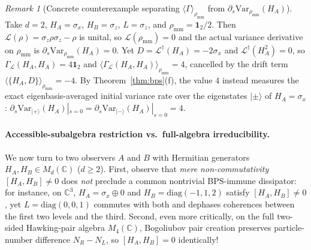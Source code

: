 \documentclass[11pt,a4paper]{article}
\theoremstyle{definition}
\theoremstyle{remark}
\newtheorem{remark}{Remark}
\newcommand{\cL}{\mathcal{L}}
\newcommand{\bbC}{\mathbb{C}}
\newcommand{\1}{\mathbf{1}}
\begin{document}
\begin{remark}[Concrete counterexample separating $\langle\Gamma\rangle_{\rho_{\mathrm{mm}}}$ from $\partial_s\mathrm{Var}_{\rho_{\mathrm{mm}}}(H_A)$]\label{rem:drift-counterexample}
Take $d=2$, $H_A = \sigma_x$, $H_B = \sigma_z$, $L = \sigma_z$, and $\rho_{\mathrm{mm}} = \1_2/2$. Then $\cL(\rho) = \sigma_z\rho\sigma_z - \rho$ is unital, so $\cL(\rho_{\mathrm{mm}}) = 0$ and the actual variance derivative on $\rho_{\mathrm{mm}}$ is $\partial_s \mathrm{Var}_{\rho_{\mathrm{mm}}}(H_A) = 0$. Yet $D = \cL^\dagger(H_A) = -2\sigma_x$ and $\cL^\dagger(H_A^2) = 0$, so $\Gamma_{\cL}(H_A,H_A) = 4\1_2$ and $\langle\Gamma_{\cL}(H_A,H_A)\rangle_{\rho_{\mathrm{mm}}} = 4$, cancelled by the drift term $\langle\{H_A,D\}\rangle_{\rho_{\mathrm{mm}}} = -4$. By Theorem~\ref{thm:bps}(f), the value $4$ instead measures the exact eigenbasis-averaged initial variance rate over the eigenstates $|\pm\rangle$ of $H_A=\sigma_x$: $\partial_s\mathrm{Var}_{|+\rangle}(H_A)|_{s=0} = \partial_s\mathrm{Var}_{|-\rangle}(H_A)|_{s=0} = 4$.
\end{remark}

\paragraph{Accessible-subalgebra restriction vs.\ full-algebra irreducibility.}
We now turn to two observers $A$ and $B$ with Hermitian generators $H_A, H_B \in M_d(\bbC)$ ($d \ge 2$). First, observe that \emph{mere non-commutativity} $[H_A, H_B] \neq 0$ does \emph{not} preclude a common nontrivial BPS-immune dissipator: for instance, on $\bbC^3$, $H_A = \sigma_x \oplus 0$ and $H_B = \mathrm{diag}(-1,1,2)$ satisfy $[H_A,H_B]\neq 0$, yet $L = \mathrm{diag}(0,0,1)$ commutes with both and dephases coherences between the first two levels and the third. Second, even more critically, on the full two-sided Hawking-pair algebra $M_4(\bbC)$, Bogoliubov pair creation preserves particle-number difference $N_R - N_L$, so $[H_A, H_B] = 0$ identically!
\end{document}
